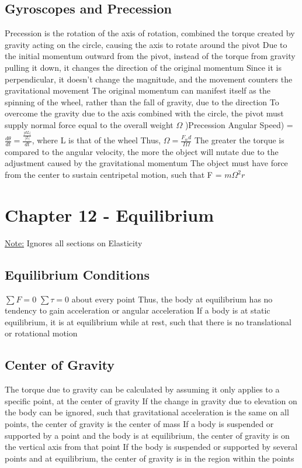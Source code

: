 \documentclass[11 pt, twoside]{article}
\newenvironment{outline*}
{
	\begin{outline}[enumerate]
	}
	{\end{outline}
}
\begin{document}
\subsection{Gyroscopes and Precession}
\begin{outline*}
\1 Precession is the rotation of the axis of rotation, combined the torque created by gravity acting on the circle, causing the axis to rotate around the pivot
\1 Due to the initial momentum outward from the pivot, instead of the torque from gravity pulling it down, it changes the direction of the original momentum
\2 Since it is perpendicular, it doesn’t change the magnitude, and the movement counters the gravitational movement
\2 The original momentum can manifest itself as the spinning of the wheel, rather than the fall of gravity, due to the direction
\2 To overcome the gravity due to the axis combined with the circle, the pivot must supply normal force equal to the overall weight
\1 $\Omega$ )Precession Angular Speed) = $\frac{d\theta}{dt} = \frac{\frac{|dL|}{|L|}}{dt}$, where L is that of the wheel
\2 Thus, $\Omega = \frac{F_wd}{I\Omega}$
\2 The greater the torque is compared to the angular velocity, the more the object will nutate due to the adjustment caused by the gravitational momentum
\2 The object must have force from the center to sustain centripetal motion, such that F = $m\Omega^2r$
\end{outline*}
\section{Chapter 12 - Equilibrium}
\underline{Note:} Ignores all sections on Elasticity
\subsection{Equilibrium Conditions}
\begin{outline*}
\1 $\sum F = 0$
\1 $\sum \tau = 0$ about every point
\1 Thus, the body at equilibrium has no tendency to gain acceleration or angular acceleration
\1 If a body is at static equilibrium, it is at equilibrium while at rest, such that there is no translational or rotational motion
\end{outline*}
\subsection{Center of Gravity}
\begin{outline*}
\1 The torque due to gravity can be calculated by assuming it only applies to a specific point, at the center of gravity
\1 If the change in gravity due to elevation on the body can be ignored, such that gravitational acceleration is the same on all points, the center of gravity is the center of mass
\1 If a body is suspended or supported by a point and the body is at equilibrium, the center of gravity is on the vertical axis from that point
\2 If the body is suspended or supported by several points and at equilibrium, the center of gravity is in the region within the points
\end{outline*}
\end{document}
